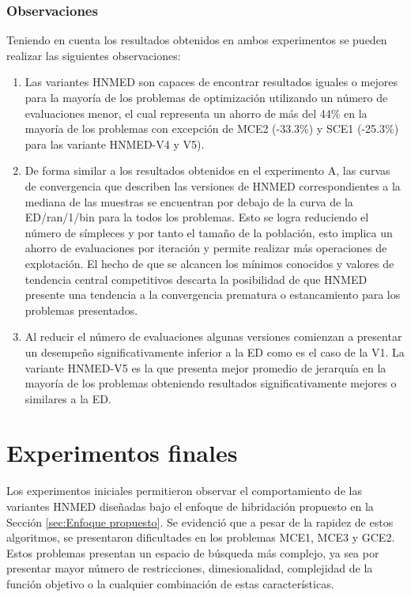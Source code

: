 \subsubsection{Observaciones}
Teniendo en cuenta los resultados obtenidos en ambos experimentos se pueden realizar las siguientes observaciones:
\begin{enumerate}
	\item Las variantes HNMED son capaces de encontrar resultados iguales o mejores para la mayoría de los problemas de optimización utilizando un número de evaluaciones menor, el cual representa un ahorro de más del 44\% en la mayoría de los problemas con excepción de MCE2 (-33.3\%) y SCE1 (-25.3\%) para las variante HNMED-V4 y V5).      
	\item De forma similar a los resultados obtenidos en el experimento A, las curvas de convergencia que describen las versiones de HNMED correspondientes a la mediana de las muestras se encuentran por debajo de la curva de la ED/ran/1/bin para la todos los problemas. Esto se logra reduciendo el número de símpleces y por tanto el tamaño de la población, esto implica un ahorro de evaluaciones por iteración y  permite realizar más operaciones de explotación. El hecho de que se alcancen los mínimos conocidos y valores de tendencia central competitivos descarta la posibilidad de que HNMED presente una tendencia a la convergencia prematura o estancamiento para los problemas presentados. 
	\item Al reducir el número de evaluaciones algunas versiones comienzan a presentar un desempeño significativamente inferior a la ED como es el caso de la V1. La variante HNMED-V5 es la que presenta mejor promedio de jerarquía en la mayoría de los problemas obteniendo resultados significativamente mejores o similares a la ED.
\end{enumerate}




\section{Experimentos finales}
Los experimentos iniciales permitieron observar el comportamiento de las variantes HNMED diseñadas bajo el enfoque de hibridación propuesto en la Sección \ref{sec:Enfoque propuesto}. Se evidenció que a pesar de la rapidez de estos algoritmos, se presentaron dificultades en los problemas MCE1, MCE3 y GCE2. Estos problemas presentan un espacio de búsqueda más complejo, ya sea por presentar mayor número de restricciones, dimesionalidad, complejidad de la función objetivo o la cualquier combinación de estas características. 


